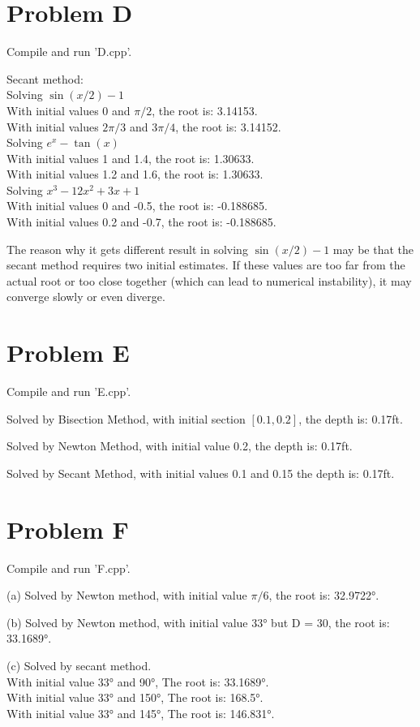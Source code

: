 \documentclass[a4paper]{article}
\begin{document}
\section*{Problem D}
Compile and run 'D.cpp'. \par
Secant method: \\
Solving $\sin(x/2)-1$\\
With initial values 0 and $\pi/2$, the root is: 3.14153. \\
With initial values $2\pi/3$ and $3\pi/4$, the root is: 3.14152.\\
Solving $e^x-\tan(x)$\\
With initial values 1 and 1.4, the root is: 1.30633.\\
With initial values 1.2 and 1.6, the root is: 1.30633.\\
Solving $x^3-12x^2+3x+1$\\
With initial values 0 and -0.5, the root is: -0.188685.\\
With initial values 0.2 and -0.7, the root is: -0.188685. \par
The reason why it gets different result in solving $\sin(x/2)-1$ may be that
the secant method requires two initial estimates. If these values are too far from the actual root or too close together (which
 can lead to numerical instability), it may converge slowly or even diverge.

\section*{Problem E}
Compile and run 'E.cpp'. \par
Solved by Bisection Method, with initial section $[0.1,0.2]$, the depth is: 0.17ft.\par
Solved by Newton Method, with initial value 0.2, the depth is: 0.17ft.\par
Solved by Secant Method, with initial values 0.1 and 0.15 the depth is: 0.17ft.\par


\section*{Problem F}
Compile and run 'F.cpp'. \par
(a) Solved by Newton method,
with initial value $\pi/6$, the root is: 32.9722°.\par
(b) Solved by Newton method,
with initial value 33° but D = 30, the root is: 33.1689°.\par
(c) Solved by secant method.\\
With initial value 33° and 90°, The root is: 33.1689°.\\
With initial value 33° and 150°, The root is: 168.5°.\\
With initial value 33° and 145°, The root is: 146.831°.\par
\end{document}

